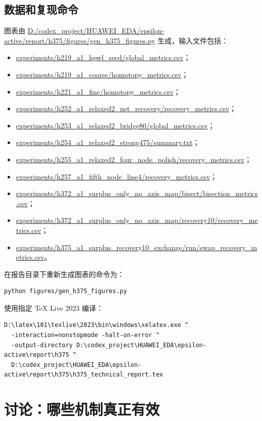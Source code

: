\documentclass[UTF8,a4paper,11pt]{ctexrep}
\begin{document}
\section{数据和复现命令}
图表由
\url{D:/codex_project/HUAWEI_EDA/epsilon-active/report/h375/figures/gen_h375_figures.py}
生成，输入文件包括：
\begin{itemize}
  \item \url{experiments/h219_a1_hpwl_seed/global_metrics.csv}；
  \item \url{experiments/h219_a1_coarse/homotopy_metrics.csv}；
  \item \url{experiments/h221_a1_fine/homotopy_metrics.csv}；
  \item \url{experiments/h252_a1_relaxed2_net_recovery/recovery_metrics.csv}；
  \item \url{experiments/h253_a1_relaxed2_bridge80/global_metrics.csv}；
  \item \url{experiments/h254_a1_relaxed2_strong475/summary.txt}；
  \item \url{experiments/h255_a1_relaxed2_four_node_polish/recovery_metrics.csv}；
  \item \url{experiments/h257_a1_fifth_node_line4/recovery_metrics.csv}；
  \item \url{experiments/h372_a1_surplus_only_no_axis_map/bisect/bisection_metrics.csv}；
  \item \url{experiments/h372_a1_surplus_only_no_axis_map/recovery10/recovery_metrics.csv}；
  \item \url{experiments/h375_a1_surplus_recovery10_exchange/run/swap_recovery_metrics.csv}。
\end{itemize}
在报告目录下重新生成图表的命令为：
\begin{verbatim}
python figures/gen_h375_figures.py
\end{verbatim}
使用指定 TeX Live 2023 编译：
\begin{verbatim}
D:\latex\101\texlive\2023\bin\windows\xelatex.exe ^
  -interaction=nonstopmode -halt-on-error ^
  -output-directory D:\codex_project\HUAWEI_EDA\epsilon-active\report\h375 ^
  D:\codex_project\HUAWEI_EDA\epsilon-active\report\h375\h375_technical_report.tex
\end{verbatim}

\chapter{讨论：哪些机制真正有效}
\end{document}
